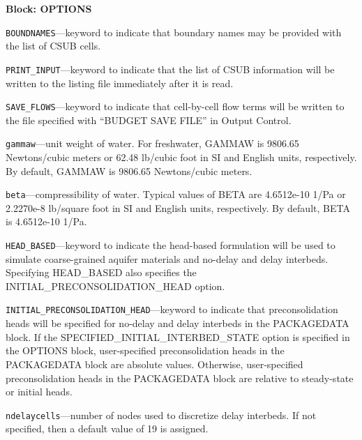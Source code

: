 
\item \textbf{Block: OPTIONS}

\begin{description}
\item \texttt{BOUNDNAMES}---keyword to indicate that boundary names may be provided with the list of CSUB cells.

\item \texttt{PRINT\_INPUT}---keyword to indicate that the list of CSUB information will be written to the listing file immediately after it is read.

\item \texttt{SAVE\_FLOWS}---keyword to indicate that cell-by-cell flow terms will be written to the file specified with ``BUDGET SAVE FILE'' in Output Control.

\item \texttt{gammaw}---unit weight of water. For freshwater, GAMMAW is 9806.65 Newtons/cubic meters or 62.48 lb/cubic foot in SI and English units, respectively. By default, GAMMAW is 9806.65 Newtons/cubic meters.

\item \texttt{beta}---compressibility of water. Typical values of BETA are 4.6512e-10 1/Pa or 2.2270e-8 lb/square foot in SI and English units, respectively. By default, BETA is 4.6512e-10 1/Pa.

\item \texttt{HEAD\_BASED}---keyword to indicate the head-based formulation will be used to simulate coarse-grained aquifer materials and no-delay and delay interbeds. Specifying HEAD\_BASED also specifies the INITIAL\_PRECONSOLIDATION\_HEAD option.

\item \texttt{INITIAL\_PRECONSOLIDATION\_HEAD}---keyword to indicate that preconsolidation heads will be specified for no-delay and delay interbeds in the PACKAGEDATA block. If the SPECIFIED\_INITIAL\_INTERBED\_STATE option is specified in the OPTIONS block, user-specified preconsolidation heads in the PACKAGEDATA block are absolute values. Otherwise, user-specified preconsolidation heads in the PACKAGEDATA block are relative to steady-state or initial heads.

\item \texttt{ndelaycells}---number of nodes used to discretize delay interbeds. If not specified, then a default value of 19 is assigned.


\end{description}
